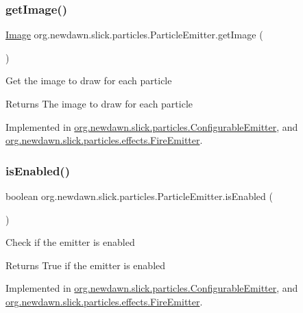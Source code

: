 \subsubsection{\texorpdfstring{get\+Image()}{getImage()}}
{\footnotesize\ttfamily \mbox{\hyperlink{classorg_1_1newdawn_1_1slick_1_1_image}{Image}} org.\+newdawn.\+slick.\+particles.\+Particle\+Emitter.\+get\+Image (\begin{DoxyParamCaption}{ }\end{DoxyParamCaption})}

Get the image to draw for each particle

\begin{DoxyReturn}{Returns}
The image to draw for each particle 
\end{DoxyReturn}


Implemented in \mbox{\hyperlink{classorg_1_1newdawn_1_1slick_1_1particles_1_1_configurable_emitter_a27d040118a59ae29818f23ceb97f37f8}{org.\+newdawn.\+slick.\+particles.\+Configurable\+Emitter}}, and \mbox{\hyperlink{classorg_1_1newdawn_1_1slick_1_1particles_1_1effects_1_1_fire_emitter_afa45cb540a0c320d45c530d499d6eae3}{org.\+newdawn.\+slick.\+particles.\+effects.\+Fire\+Emitter}}.

\mbox{\label{interfaceorg_1_1newdawn_1_1slick_1_1particles_1_1_particle_emitter_a6a6fabad4971a0634a0a99dbed53c47d}} 
\subsubsection{\texorpdfstring{is\+Enabled()}{isEnabled()}}
{\footnotesize\ttfamily boolean org.\+newdawn.\+slick.\+particles.\+Particle\+Emitter.\+is\+Enabled (\begin{DoxyParamCaption}{ }\end{DoxyParamCaption})}

Check if the emitter is enabled

\begin{DoxyReturn}{Returns}
True if the emitter is enabled 
\end{DoxyReturn}


Implemented in \mbox{\hyperlink{classorg_1_1newdawn_1_1slick_1_1particles_1_1_configurable_emitter_a2e85f026589d4cd80c64dd3e983461fc}{org.\+newdawn.\+slick.\+particles.\+Configurable\+Emitter}}, and \mbox{\hyperlink{classorg_1_1newdawn_1_1slick_1_1particles_1_1effects_1_1_fire_emitter_aae670e35b6ee409d83482a14e4228b75}{org.\+newdawn.\+slick.\+particles.\+effects.\+Fire\+Emitter}}.


